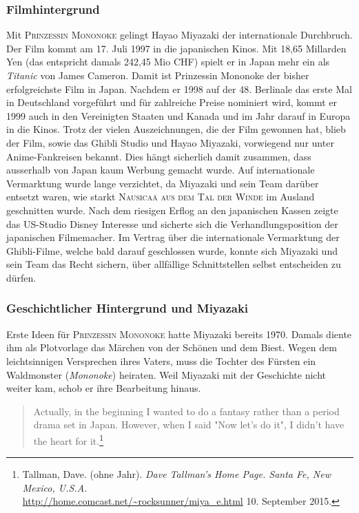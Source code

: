 \subsubsection{Filmhintergrund} 
Mit \textsc{Prinzessin Mononoke} gelingt Hayao Miyazaki der internationale Durchbruch. Der Film kommt am 17. Juli 1997 in die japanischen Kinos. Mit 18,65 Millarden Yen (das entspricht damals 242,45 Mio CHF) spielt er in Japan mehr ein als \emph{Titanic} von James Cameron. Damit ist Prinzessin Mononoke der bisher erfolgreichste Film in Japan. Nachdem er 1998 auf der 48. Berlinale das erste Mal in Deutschland vorgeführt und für zahlreiche Preise nominiert wird, kommt er 1999 auch in den Vereinigten Staaten und Kanada und im Jahr darauf in Europa in die Kinos. Trotz der vielen Auszeichnungen, die der Film gewonnen hat, blieb der Film, sowie das Ghibli Studio und Hayao Miyazaki, vorwiegend nur unter Anime-Fankreisen bekannt. Dies hängt sicherlich damit zusammen, dass ausserhalb von Japan kaum Werbung gemacht wurde. Auf internationale Vermarktung wurde lange verzichtet, da Miyazaki und sein Team darüber entsetzt waren, wie starkt \textsc{Nausicaä aus dem Tal der Winde} im Ausland geschnitten wurde. 
Nach dem riesigen Erflog an den japanischen Kassen zeigte das US-Studio Disney Interesse und sicherte sich die Verhandlungsposition der japanischen Filmemacher. Im Vertrag über die internationale Vermarktung der Ghibli-Filme, welche bald darauf geschlossen wurde, konnte sich Miyazaki und sein Team das Recht sichern, über allfällige Schnittstellen selbst entscheiden zu dürfen. 

\subsubsection*{Geschichtlicher Hintergrund und Miyazaki} 
Erste Ideen für \textsc{Prinzessin Mononoke} hatte Miyazaki bereits 1970. Damals diente ihm als Plotvorlage das Märchen von der Schönen und dem Biest. Wegen dem leichtsinnigen Versprechen ihres Vaters, muss die Tochter des Fürsten ein Waldmonster (\emph{Mononoke}) heiraten. Weil Miyazaki mit der Geschichte nicht weiter kam, schob er ihre Bearbeitung hinaus. 

\begin{quote} \glqq Actually, in the beginning I wanted to do a fantasy rather than a period drama set in Japan. However, when I said "Now let's do it", I didn't have the heart for it.\grqq \footnote{Tallman, Dave. (ohne Jahr). \emph{Dave Tallman's Home Page. Santa Fe, New Mexico, U.S.A.}\\ \url{http://home.comcast.net/~rocksunner/miya_e.html} 10. September 2015.}
\end{quote}

